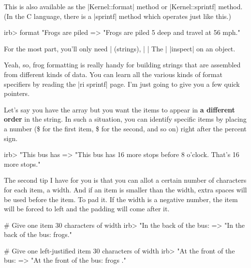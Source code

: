\documentclass[12pt,twoside]{report}
\newcommand*{\plaininline}{\fontfamily{fvm}\small\selectfont}
\begin{document}
This is also available as the
\rubyinline|Kernel::format| method or
\rubyinline|Kernel::sprintf| method.  (In the C
language, there is a \rubyinline|sprintf| method which
operates just like this.)


\begin{consolecode}

 irb> format "Frogs are piled %
   => "Frogs are piled 5 deep and travel at 56 mph."

\end{consolecode}


For the most part, you'll only need \rubyinline|%
(strings), \rubyinline|%
\rubyinline|%
The \rubyinline|%
\rubyinline|inspect| on an object.

Yeah, so, frog formatting is really handy for building strings that
are assembled from different kinds of data.  You can learn all the
various kinds of format specifiers by reading the
\rubyinline|ri sprintf| page.  I'm just going to give
you a few quick pointers.

Let's say you have the array but you want the items to appear in {\bf
  a different order} in the string.  In such a situation, you can
identify specific items by placing a number
({\plaininline 1\$} for the first item,
{\plaininline 2\$} for the second, and so on) right after
the percent sign.


\begin{consolecode}

 irb> "This bus has %
   => "This bus has 16 more stops before 8 o'clock.  That's 16 more stops."

\end{consolecode}


The second tip I have for you is that you can allot a certain number
of characters for each item, a width.  And if an item is smaller than
the width, extra spaces will be used before the item.  To pad it. If
the width is a negative number, the item will be forced to left and
the padding will come after it.


\begin{consolecode}

 # Give one item 30 characters of width
 irb> "In the back of the bus: %
   => "In the back of the bus:                          frogs."

 # Give one left-justified item 30 characters of width
 irb> "At the front of the bus: %
   => "At the front of the bus: frogs                         ."

\end{consolecode}
\end{document}
